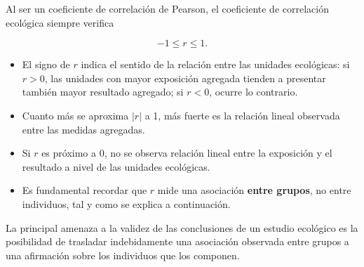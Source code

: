 \documentclass[
  spanish,
  a4paper,
]{scrreport}
\providecommand{\tightlist}{%
  \setlength{\itemsep}{0pt}\setlength{\parskip}{0pt}}
\theoremstyle{definition}
\theoremstyle{definition}
\theoremstyle{remark}
\begin{document}
\begin{tcolorbox}[enhanced jigsaw, arc=.35mm, bottomrule=.15mm, bottomtitle=1mm, breakable, colback=white, colbacktitle=quarto-callout-important-color!10!white, colframe=quarto-callout-important-color-frame, coltitle=black, left=2mm, leftrule=.75mm, opacityback=0, opacitybacktitle=0.6, rightrule=.15mm, title=\textcolor{quarto-callout-important-color}{\faExclamation}\hspace{0.5em}{Importante}, titlerule=0mm, toprule=.15mm, toptitle=1mm]

Al ser un coeficiente de correlación de Pearson, el coeficiente de
correlación ecológica siempre verifica

\[-1\leq r\leq 1.\]

\end{tcolorbox}

\begin{tcolorbox}[enhanced jigsaw, arc=.35mm, bottomrule=.15mm, bottomtitle=1mm, breakable, colback=white, colbacktitle=quarto-callout-note-color!10!white, colframe=quarto-callout-note-color-frame, coltitle=black, left=2mm, leftrule=.75mm, opacityback=0, opacitybacktitle=0.6, rightrule=.15mm, title=\textcolor{quarto-callout-note-color}{\faInfo}\hspace{0.5em}{Interpretación}, titlerule=0mm, toprule=.15mm, toptitle=1mm]

\begin{itemize}
\tightlist
\item
  El signo de \(r\) indica el sentido de la relación entre las unidades
  ecológicas: si \(r>0\), las unidades con mayor exposición agregada
  tienden a presentar también mayor resultado agregado; si \(r<0\),
  ocurre lo contrario.
\item
  Cuanto más se aproxima \(|r|\) a 1, más fuerte es la relación lineal
  observada entre las medidas agregadas.
\item
  Si \(r\) es próximo a 0, no se observa relación lineal entre la
  exposición y el resultado a nivel de las unidades ecológicas.
\item
  Es fundamental recordar que \(r\) mide una asociación \textbf{entre
  grupos}, no entre individuos, tal y como se explica a continuación.
\end{itemize}

\end{tcolorbox}

La principal amenaza a la validez de las conclusiones de un estudio
ecológico es la posibilidad de trasladar indebidamente una asociación
observada entre grupos a una afirmación sobre los individuos que los
componen.
\end{document}
